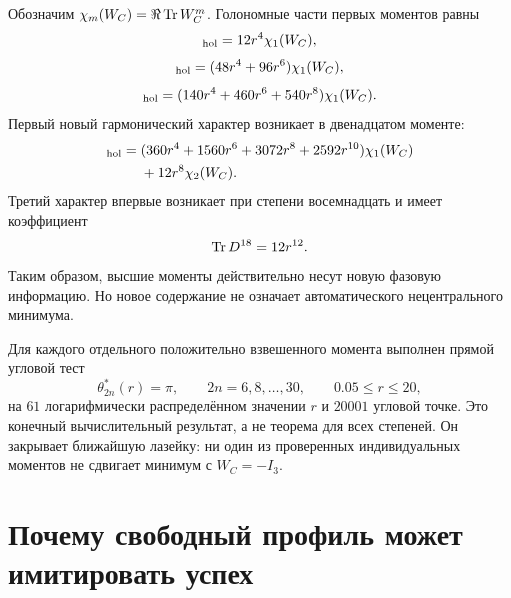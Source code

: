 Обозначим $\chi_m(W_C)=\Re\operatorname{Tr} W_C^m$. Голономные части первых моментов
равны
\begin{equation}
 [\Tr D^6]_{\rm hol}=12r^4\chi_1(W_C),
 \label{eq:v7-higher-character-six}
\end{equation}
\begin{equation}
 [\Tr D^8]_{\rm hol}=(48r^4+96r^6)\chi_1(W_C),
 \label{eq:v7-higher-character-eight}
\end{equation}
\begin{equation}
 [\Tr D^{10}]_{\rm hol}
 =(140r^4+460r^6+540r^8)\chi_1(W_C).
 \label{eq:v7-higher-character-ten}
\end{equation}
Первый новый гармонический характер возникает в двенадцатом моменте:
\begin{align}
 [\Tr D^{12}]_{\rm hol}
 ={}&(360r^4+1560r^6+3072r^8+2592r^{10})\chi_1(W_C)
 \nonumber\\
 &+12r^8\chi_2(W_C).
 \label{eq:v7-higher-character-twelve}
\end{align}
Третий характер впервые возникает при степени восемнадцать и имеет
коэффициент
\begin{equation}
 [\chi_3]\Tr D^{18}=12r^{12}.
 \label{eq:v7-higher-character-eighteen-third}
\end{equation}
Таким образом, высшие моменты действительно несут новую фазовую информацию.
Но новое содержание не означает автоматического нецентрального минимума.

Для каждого отдельного положительно взвешенного момента выполнен прямой
угловой тест
\begin{equation}
 \theta_{2n}^*(r)=\pi,
 \qquad
 2n=6,8,\ldots,30,
 \qquad 0.05\le r\le20,
 \label{eq:v7-higher-character-individual-minima}
\end{equation}
на $61$ логарифмически распределённом значении $r$ и $20001$ угловой точке.
Это конечный вычислительный результат, а не теорема для всех степеней. Он
закрывает ближайшую лазейку: ни один из проверенных индивидуальных моментов
не сдвигает минимум с $W_C=-I_3$.

\section{Почему свободный профиль может имитировать успех}

